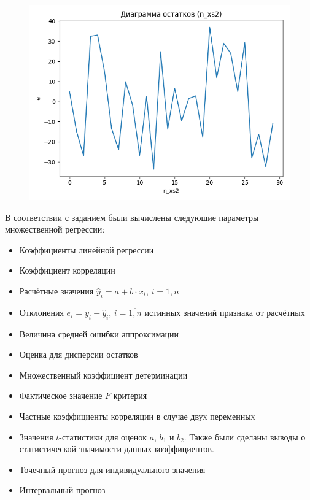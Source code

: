 \begin{figure}[H]
\begin{minipage}[H]{0.32\linewidth}
		\begin{center}
			\includegraphics[width=\linewidth]{figures/res_plot_n_xs2}
		\end{center}
	\end{minipage}
\end{figure}


В соответствии с заданием были вычислены следующие параметры множественной регрессии:

\begin{itemize}

	\item Коэффициенты линейной регрессии
	\item Коэффициент корреляции
	\item Расчётные значения $\hat{y}_i = a + b \cdot x_i$, $i = \overline{1,n}$
	\item Отклонения $e_i = y_i - \hat{y}_i$, $i = \overline{1, n}$ истинных значений признака от расчётных
	\item Величина средней ошибки аппроксимации
	\item Оценка для дисперсии остатков
	\item Множественный коэффициент детерминации
	\item Фактическое значение $F$ критерия
	\item Частные коэффициенты корреляции в случае двух переменных
	\item Значения $t$-статистики для оценок $a$, $b_1$ и $b_2$. Также были сделаны выводы о статистической значимости данных коэффициентов.
	\item Точечный прогноз для индивидуального значения
	\item Интервальный прогноз

\end{itemize}

